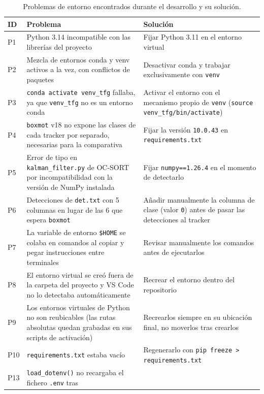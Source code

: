 \begin{table}[htp]
\centering
\caption{Problemas de entorno encontrados durante el desarrollo y su solución.}
\label{tab:impl-problemas}
\renewcommand{\arraystretch}{1.05}
\footnotesize
\begin{tabular}{|p{0.7cm}|p{5.5cm}|p{5.3cm}|}
\hline
\rowcolor{gray!25}
\textbf{ID} & \textbf{Problema} & \textbf{Solución} \\
\hline
P1 & Python 3.14 incompatible con las librerías del proyecto &
  Fijar Python 3.11 en el entorno virtual \\
\hline
P2 & Mezcla de entornos conda y venv activos a la vez, con conflictos de
  paquetes & Desactivar conda y trabajar exclusivamente con \texttt{venv} \\
\hline
P3 & \texttt{conda activate venv\_tfg} fallaba, ya que \texttt{venv\_tfg}
  no es un entorno conda & Activar el entorno con el mecanismo propio de
  \texttt{venv} (\texttt{source venv\_tfg/bin/activate}) \\
\hline
P4 & \texttt{boxmot} v18 no expone las clases de cada tracker por separado,
  necesarias para la comparativa & Fijar la versión \texttt{10.0.43} en
  \texttt{requirements.txt} \\
\hline
P5 & Error de tipo en \texttt{kalman\_filter.py} de OC-SORT por
  incompatibilidad con la versión de NumPy instalada & Fijar
  \texttt{numpy==1.26.4} en el momento de detectarlo\footnotemark \\
\hline
P6 & Detecciones de \texttt{det.txt} con 5 columnas en lugar de las 6 que
  espera \texttt{boxmot} & Añadir manualmente la columna de clase (valor
  \texttt{0}) antes de pasar las detecciones al tracker \\
\hline
P7 & La variable de entorno \texttt{\$HOME} se colaba en comandos al
  copiar y pegar instrucciones entre terminales & Revisar manualmente los
  comandos antes de ejecutarlos \\
\hline
P8 & El entorno virtual se creó fuera de la carpeta del proyecto y VS Code
  no lo detectaba automáticamente & Recrear el entorno dentro del
  repositorio \\
\hline
P9 & Los entornos virtuales de Python no son reubicables (las rutas
  absolutas quedan grabadas en sus scripts de activación) &
  Recrearlos siempre en su ubicación final, no moverlos tras crearlos \\
\hline
P10 & \texttt{requirements.txt} estaba vacío & Regenerarlo con
  \texttt{pip freeze > requirements.txt} \\
\hline
P13 & \texttt{load\_dotenv()} no recargaba el fichero \texttt{.env} tras

\end{tabular}
\end{table}
